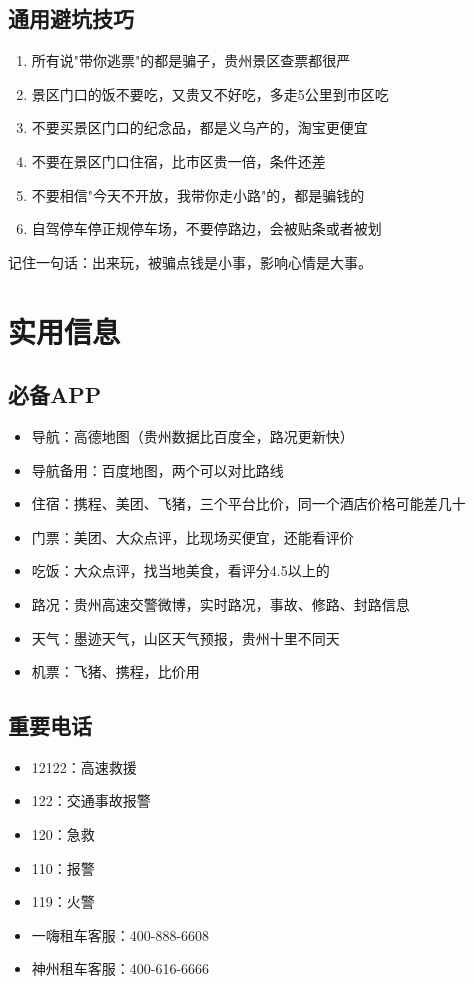 \documentclass[12pt,a4paper,UTF8]{ctexart}
\begin{document}
\subsection{通用避坑技巧}
\begin{enumerate}
\item 所有说"带你逃票"的都是骗子，贵州景区查票都很严
\item 景区门口的饭不要吃，又贵又不好吃，多走5公里到市区吃
\item 不要买景区门口的纪念品，都是义乌产的，淘宝更便宜
\item 不要在景区门口住宿，比市区贵一倍，条件还差
\item 不要相信"今天不开放，我带你走小路"的，都是骗钱的
\item 自驾停车停正规停车场，不要停路边，会被贴条或者被划
\end{enumerate}

记住一句话：出来玩，被骗点钱是小事，影响心情是大事。

\newpage

\section{实用信息}

\subsection{必备APP}
\begin{itemize}
\item 导航：高德地图（贵州数据比百度全，路况更新快）
\item 导航备用：百度地图，两个可以对比路线
\item 住宿：携程、美团、飞猪，三个平台比价，同一个酒店价格可能差几十
\item 门票：美团、大众点评，比现场买便宜，还能看评价
\item 吃饭：大众点评，找当地美食，看评分4.5以上的
\item 路况：贵州高速交警微博，实时路况，事故、修路、封路信息
\item 天气：墨迹天气，山区天气预报，贵州十里不同天
\item 机票：飞猪、携程，比价用
\end{itemize}

\subsection{重要电话}
\begin{itemize}
\item 12122：高速救援
\item 122：交通事故报警
\item 120：急救
\item 110：报警
\item 119：火警
\item 一嗨租车客服：400-888-6608
\item 神州租车客服：400-616-6666
\end{itemize}
\end{document}
